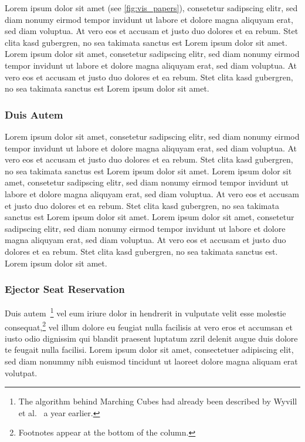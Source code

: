 \documentclass[widereview]{vgtc}             %
\begin{document}
Lorem ipsum dolor sit amet (see \cref{fig:vis_papers}), consetetur sadipscing elitr, sed diam nonumy eirmod tempor invidunt ut labore et dolore magna aliquyam erat, sed diam voluptua.
At vero eos et accusam et justo duo dolores et ea rebum.
Stet clita kasd gubergren, no sea takimata sanctus est Lorem ipsum dolor sit amet.
Lorem ipsum dolor sit amet, consetetur sadipscing elitr, sed diam nonumy eirmod tempor invidunt ut labore et dolore magna aliquyam erat, sed diam voluptua.
At vero eos et accusam et justo duo dolores et ea rebum.
Stet clita kasd gubergren, no sea takimata sanctus est Lorem ipsum dolor sit amet.


\subsubsection{Duis Autem}

Lorem ipsum dolor sit amet, consetetur sadipscing elitr, sed diam nonumy eirmod tempor invidunt ut labore et dolore magna aliquyam erat, sed diam voluptua.
At vero eos et accusam et justo duo dolores et ea rebum.
Stet clita kasd gubergren, no sea takimata sanctus est Lorem ipsum dolor sit amet.
Lorem ipsum dolor sit amet, consetetur sadipscing elitr, sed diam nonumy eirmod tempor invidunt ut labore et
dolore magna aliquyam erat, sed diam voluptua.
At vero eos et accusam et justo duo dolores et ea rebum.
Stet clita kasd gubergren, no sea takimata sanctus est Lorem ipsum dolor sit amet.
Lorem ipsum dolor sit amet, consetetur sadipscing elitr, sed diam nonumy eirmod tempor invidunt ut labore et dolore magna aliquyam erat, sed diam
voluptua.
At vero eos et accusam et justo duo dolores et ea rebum.
Stet clita kasd gubergren, no sea takimata sanctus est.
Lorem ipsum dolor sit amet.




\subsubsection{Ejector Seat Reservation}

Duis autem~\cite{Lorensen:1987:MCA}\footnote{The algorithm behind Marching Cubes \cite{Lorensen:1987:MCA} had already been described by Wyvill et al.\ \cite{Wyvill:1986:DSS} a year earlier.} 
vel eum iriure dolor in hendrerit in vulputate velit esse molestie consequat,\footnote{Footnotes appear at the bottom of the column.}
vel illum dolore eu feugiat nulla facilisis at vero eros et accumsan et iusto odio dignissim qui blandit praesent luptatum zzril delenit augue duis dolore te feugait nulla facilisi.
Lorem ipsum dolor sit amet, consectetuer adipiscing elit, sed diam nonummy nibh euismod tincidunt ut laoreet dolore magna aliquam erat volutpat.
\end{document}
